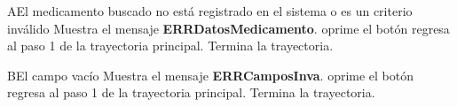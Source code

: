 		\begin{UCtrayectoriaA}{A}{El medicamento buscado no est\'a registrado en el sistema o es un criterio inv\'alido}
			\UCpaso Muestra el mensaje {\bf ERRDatosMedicamento}.
			\UCpaso[\UCactor] oprime el botón 
			\UCpaso[\UCactor] regresa al paso 1 de la trayectoria principal.  
			\UCpaso[] Termina la trayectoria.
		\end{UCtrayectoriaA}
		
		
		\begin{UCtrayectoriaA}{B}{El campo vac\'io}
			\UCpaso Muestra el mensaje {\bf ERRCamposInva}.
			\UCpaso[\UCactor] oprime el botón 
			\UCpaso[\UCactor] regresa al paso 1 de la trayectoria principal.  
			\UCpaso[] Termina la trayectoria.
		\end{UCtrayectoriaA}
		
